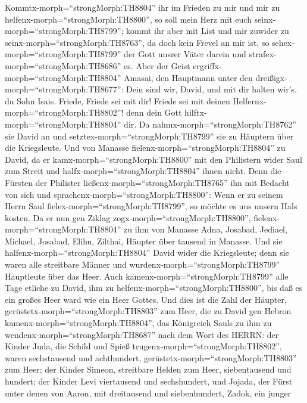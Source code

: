 Kommtx-morph=``strongMorph:TH8804'' ihr im Frieden zu mir und mir zu
helfenx-morph=``strongMorph:TH8800'', so soll mein Herz mit euch
seinx-morph=``strongMorph:TH8799''; kommt ihr aber mit List und mir
zuwider zu seinx-morph=``strongMorph:TH8763'', da doch kein Frevel an
mir ist, so sehex-morph=``strongMorph:TH8799'' der Gott unsrer Väter
darein und strafex-morph=``strongMorph:TH8686'' es.  Aber
der Geist ergriffx-morph=``strongMorph:TH8804'' Amasai, den Hauptmann
unter den dreißigx-morph=``strongMorph:TH8677'': Dein sind wir, David,
und mit dir halten wir's, du Sohn Isais. Friede, Friede sei mit dir!
Friede sei mit deinen Helfernx-morph=``strongMorph:TH8802''! denn dein
Gott hilftx-morph=``strongMorph:TH8804'' dir. Da
nahmx-morph=``strongMorph:TH8762'' sie David an und
setztex-morph=``strongMorph:TH8799'' sie zu Häuptern über die
Kriegsleute.  Und von Manasse
fielenx-morph=``strongMorph:TH8804'' zu David, da er
kamx-morph=``strongMorph:TH8800'' mit den Philistern wider Saul zum
Streit und halfx-morph=``strongMorph:TH8804'' ihnen nicht. Denn die
Fürsten der Philister ließenx-morph=``strongMorph:TH8765'' ihn mit
Bedacht von sich und sprachenx-morph=``strongMorph:TH8800'': Wenn er zu
seinem Herrn Saul fielex-morph=``strongMorph:TH8799'', so möchte es uns
unsern Hals kosten.  Da er nun gen Ziklag
zogx-morph=``strongMorph:TH8800'', fielenx-morph=``strongMorph:TH8804''
zu ihm von Manasse Adna, Josabad, Jediael, Michael, Josabad, Elihu,
Zilthai, Häupter über tausend in Manasse.  Und sie
halfenx-morph=``strongMorph:TH8804'' David wider die Kriegsleute; denn
sie waren alle streitbare Männer und
wurdenx-morph=``strongMorph:TH8799'' Hauptleute über das Heer.
 Auch kamenx-morph=``strongMorph:TH8799'' alle Tage etliche
zu David, ihm zu helfenx-morph=``strongMorph:TH8800'', bis daß es ein
großes Heer ward wie ein Heer Gottes.  Und dies ist die
Zahl der Häupter, gerüstetx-morph=``strongMorph:TH8803'' zum Heer, die
zu David gen Hebron kamenx-morph=``strongMorph:TH8804'', das Königreich
Sauls zu ihm zu wendenx-morph=``strongMorph:TH8687'' nach dem Wort des
HERRN:  der Kinder Juda, die Schild und Spieß
trugenx-morph=``strongMorph:TH8802'', waren sechstausend und
achthundert, gerüstetx-morph=``strongMorph:TH8803'' zum Heer;
 der Kinder Simeon, streitbare Helden zum Heer,
siebentausend und hundert;  der Kinder Levi viertausend und
sechshundert,  und Jojada, der Fürst unter denen von Aaron,
mit dreitausend und siebenhundert,  Zadok, ein junger
